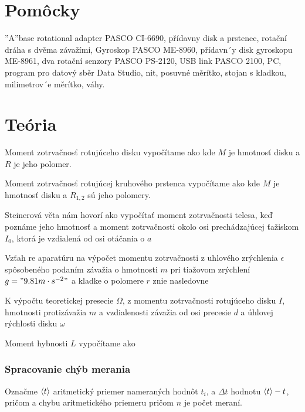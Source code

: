 \documentclass[a4paper,10pt]{article}
\begin{document}
\section{Pomôcky}
”A”base rotational adapter PASCO CI-6690, přídavny disk a prstenec, rotační dráha
s dvěma závažími, Gyroskop PASCO ME-8960, přídavn´y disk gyroskopu ME-8961, dva rotační
senzory PASCO PS-2120, USB link PASCO 2100, PC, program pro datový sběr Data
Studio, nit, posuvné měrítko, stojan s kladkou, milimetrov´e měrítko, váhy.

\section{Teória}

Moment zotrvačnosť rotujúceho disku vypočítame ako
kde $M$ je hmotnosť disku a $R$ je jeho polomer.
 
Moment zotrvačnosť rotujúcej kruhového prstenca vypočítame ako
kde $M$ je hmotnosť disku a $R_{1,2}$ sú jeho polomery.

Steinerová věta nám hovorí ako vypočítať moment zotrvačnosti telesa,
keď poznáme jeho hmotnosť a moment zotrvačnosti okolo osi prechádzajúcej ťažiskom $I_0$, ktorá je vzdialená od osi otáčania o $a$

Vzťah re aparatúru na výpočet momentu zotrvačnosti z uhlového zrýchlenia $\epsilon$ 
spôsobeného podaním závažia o hmotnosti $m$ pri tiažovom zrýchlení $g="9.81 m\cdot s^{-2}"$
a kladke o polomere $r$ znie nasledovne

K výpočtu teoretickej presecie $\Omega$, z momentu zotrvačnosti rotujúceho disku $I$, hmotnosti protizávažia $m$ a vzdialenosti závažia od osi precesie $d$ a úhlovej rýchlosti disku $\omega$

Moment hybnosti $L$ vypočítame ako

\subsubsection{Spracovanie chýb merania}

Označme $\left< t \right>$ aritmetický priemer nameraných hodnôt $t_i$, a $\Delta t$ hodnotu $\left< t \right>-t$, pričom 
a chybu aritmetického priemeru 
pričom $n$ je počet meraní.
\end{document}
